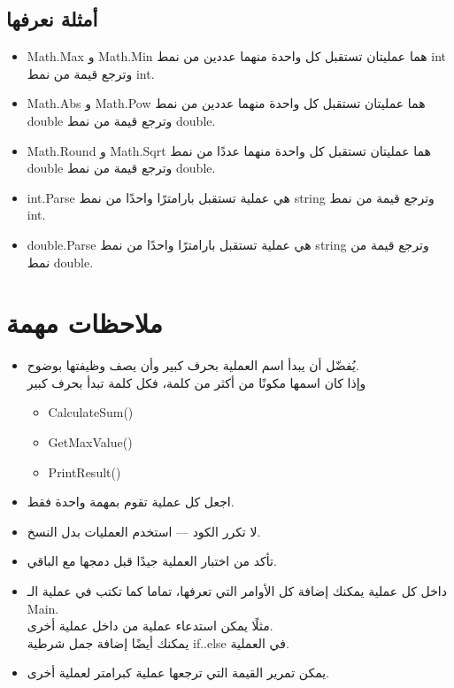 \documentclass[12pt]{article}
\begin{document}
\subsection*{أمثلة نعرفها}
\begin{itemize}
    \item \textenglish{Math.Max} و \textenglish{Math.Min} هما عمليتان تستقبل كل واحدة منهما عددين من نمط \textenglish{int} وترجع قيمة من نمط \textenglish{int}.
    \item \textenglish{Math.Abs} و \textenglish{Math.Pow} هما عمليتان تستقبل كل واحدة منهما عددين من نمط \textenglish{double} وترجع قيمة من نمط \textenglish{double}.
    \item \textenglish{Math.Round} و \textenglish{Math.Sqrt} هما عمليتان تستقبل كل واحدة منهما عددًا من نمط \textenglish{double} وترجع قيمة من نمط \textenglish{double}.
    \item \textenglish{int.Parse} هي عملية تستقبل بارامترًا واحدًا من نمط \textenglish{string} وترجع قيمة من نمط \textenglish{int}.
    \item \textenglish{double.Parse} هي عملية تستقبل بارامترًا واحدًا من نمط \textenglish{string} وترجع قيمة من نمط \textenglish{double}.
\end{itemize}

\section{ملاحظات مهمة}

\begin{itemize}
\item
    يُفضّل أن يبدأ اسم العملية بحرف كبير وأن يصف وظيفتها بوضوح. \\
وإذا كان اسمها مكونًا من أكثر من كلمة، فكل كلمة تبدأ بحرف كبير
\begin{itemize}
    \item \textenglish{CalculateSum()}
    \item \textenglish{GetMaxValue()}
    \item \textenglish{PrintResult()}
\end{itemize}

\item اجعل كل عملية تقوم بمهمة واحدة فقط.
\item لا تكرر الكود — استخدم العمليات بدل النسخ.
\item تأكد من اختبار العملية جيدًا قبل دمجها مع الباقي.
\item داخل كل عملية يمكنك إضافة كل الأوامر التي تعرفها، تماما كما تكتب في عملية الـ \textenglish{Main}. \\
مثلًا يمكن استدعاء عملية من داخل عملية أخرى. \\
يمكنك أيضًا إضافة جمل شرطية \textenglish{if..else} في العملية.
\item يمكن تمرير القيمة التي ترجعها عملية كبرامتر لعملية أخرى.

\end{itemize}
\end{document}
